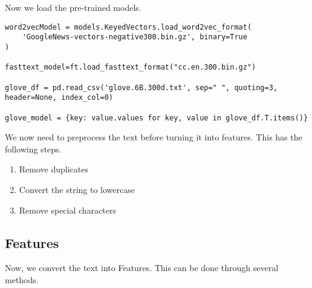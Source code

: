 \documentclass{article}
\begin{document}
Now we load the pre-trained models.

\begin{lstlisting}
word2vecModel = models.KeyedVectors.load_word2vec_format(
    'GoogleNews-vectors-negative300.bin.gz', binary=True
)

fasttext_model=ft.load_fasttext_format("cc.en.300.bin.gz")

glove_df = pd.read_csv('glove.6B.300d.txt', sep=" ", quoting=3, header=None, index_col=0)

glove_model = {key: value.values for key, value in glove_df.T.items()}
\end{lstlisting}

\medskip

We now need to preprocess the text before turning it into features. This has the following steps.

\begin{enumerate}
    \item{Remove duplicates}
    \item{Convert the string to lowercase}
    \item{Remove special characters}
\end{enumerate}

\subsection{Features}

Now, we convert the text into Features. This can be done through several methods.
\end{document}
